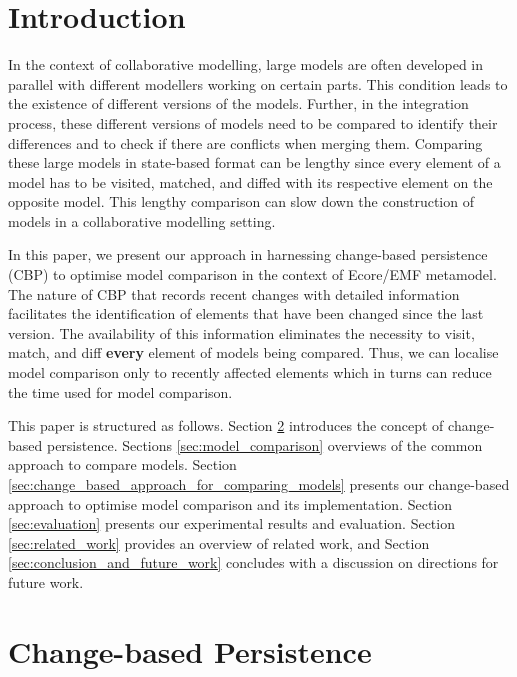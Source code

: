 \documentclass{llncs}
\begin{document}
\vspace{-20pt}
\section{Introduction}
\label{sec:introduction}
In the context of collaborative modelling, large models are often developed in parallel with different modellers working on certain parts. This condition leads to the existence of different versions of the models. Further, in the integration process, these different versions of models need to be compared to identify their differences and to check if there are conflicts when merging them. Comparing these large models in state-based format can be lengthy since every element of a model has to be visited, matched, and diffed with its respective element on the opposite model. 
This lengthy comparison can slow down the construction of models in a collaborative modelling setting. 

In this paper, we present our approach in harnessing change-based persistence (CBP) to optimise model comparison in the context of Ecore/EMF metamodel. The nature of CBP that records recent changes with detailed information facilitates the identification of elements that have been changed since the last version. The availability of this information eliminates the necessity to visit, match, and diff \textbf{every} element of models being compared. Thus, we can localise model comparison only to recently affected elements which in turns can reduce the time used for model comparison.

This paper is structured as follows. Section \ref{sec:change-based_persistence} introduces the concept of change-based persistence. Sections \ref{sec:model_comparison} overviews of the common approach to compare models.
Section \ref{sec:change_based_approach_for_comparing_models} presents our change-based approach to optimise model comparison and its implementation. Section \ref{sec:evaluation} presents our experimental results and evaluation. Section \ref{sec:related_work} provides an overview of related work, and Section \ref{sec:conclusion_and_future_work} concludes with a discussion on directions for future work.


\section{Change-based Persistence}
\label{sec:change-based_persistence}
\end{document}
